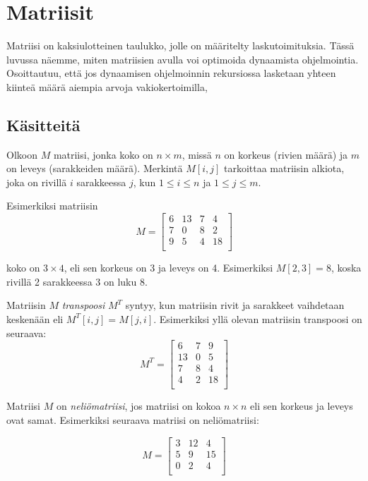 \chapter{Matriisit}

Matriisi on kaksiulotteinen taulukko,
jolle on määritelty laskutoimituksia.
Tässä luvussa näemme, miten matriisien
avulla voi optimoida dynaamista ohjelmointia.
Osoittautuu, että jos dynaamisen ohjelmoinnin rekursiossa
lasketaan yhteen kiinteä määrä aiempia arvoja
vakiokertoimilla,

\section{Käsitteitä}

Olkoon $M$ matriisi, jonka koko on $n \times m$,
missä $n$ on korkeus (rivien määrä)
ja $m$ on leveys (sarakkeiden määrä).
Merkintä $M[i,j]$ tarkoittaa matriisin alkiota,
joka on rivillä $i$ sarakkeessa $j$,
kun $1 \le i \le n$ ja $1 \le j \le m$.

Esimerkiksi matriisin
\[
M = 
 \begin{bmatrix}
  6 & 13 & 7 & 4 \\
  7 & 0 & 8 & 2 \\
  9 & 5 & 4 & 18 \\
 \end{bmatrix}
\]

koko on $3 \times 4$,
eli sen korkeus on 3 ja leveys on 4.
Esimerkiksi $M[2,3]=8$,
koska rivillä 2 sarakkeessa 3
on luku 8.

Matriisin $M$ \textit{transpoosi} $M^T$ syntyy,
kun matriisin rivit ja sarakkeet vaihdetaan keskenään
eli $M^T[i,j]=M[j,i]$.
Esimerkiksi yllä olevan matriisin transpoosi
on seuraava:
\[
M^T = 
 \begin{bmatrix}
  6 & 7 & 9 \\
  13 & 0 & 5 \\
  7 & 8 & 4 \\
  4 & 2 & 18 \\
 \end{bmatrix}
\]

Matriisi $M$ on \textit{neliömatriisi}, jos matriisi
on kokoa $n \times n$ eli sen korkeus ja leveys ovat samat.
Esimerkiksi seuraava matriisi on neliömatriisi:

\[
M = 
 \begin{bmatrix}
  3 & 12 & 4  \\
  5 & 9 & 15  \\
  0 & 2 & 4 \\
 \end{bmatrix}
\]

